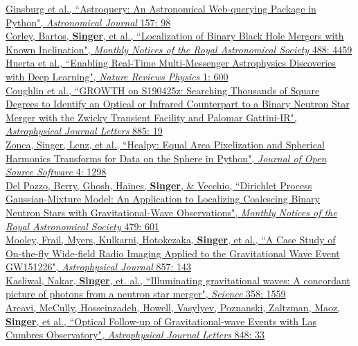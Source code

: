 \documentclass[10pt, letterpaper]{article} %
\newcommand{\years}[1]{\marginnote{\scriptsize #1}} %
\begin{document}
%
\years{2019}\href{https://doi.org/10.3847/1538-3881/aafc33}{Ginsburg et al., “Astroquery: An Astronomical Web-querying Package in Python", \emph{Astronomical Journal} 157: 98}\\[0.125cm]
%
\years{2019}\href{https://doi.org/10.1093/mnras/stz2072}{Corley, Bartos, \textbf{Singer}, et al., “Localization of Binary Black Hole Mergers with Known Inclination", \emph{Monthly Notices of the Royal Astronomical Society} 488: 4459}\\[0.125cm]
%
\years{2019}\href{https://doi.org/10.1038/s42254-019-0097-4}{Huerta et al., “Enabling Real-Time Multi-Messenger Astrophysics Discoveries with Deep Learning", \emph{Nature Reviews Physics} 1: 600}\\[0.125cm]
%
\years{2019}\href{https://doi.org/10.3847/2041-8213/ab4ad8}{Coughlin et al., “GROWTH on S190425z: Searching Thousands of Square Degrees to Identify an Optical or Infrared Counterpart to a Binary Neutron Star Merger with the Zwicky Transient Facility and Palomar Gattini-IR", \emph{Astrophysical Journal Letters} 885: 19}\\[0.125cm]
%
\years{2019}\href{https://doi.org/10.21105/joss.01298}{Zonca, Singer, Lenz, et al., “Healpy: Equal Area Pixelization and Spherical Harmonics Transforms for Data on the Sphere in Python", \emph{Journal of Open Source Software} 4: 1298}\\[0.125cm]
%
\years{2018}\href{https://doi.org/10.1093/mnras/sty1485}{Del Pozzo, Berry, Ghosh, Haines, \textbf{Singer}, \& Vecchio, “Dirichlet Process Gaussian-Mixture Model: An Application to Localizing Coalescing Binary Neutron Stars with Gravitational-Wave Observations", \emph{Monthly Notices of the Royal Astronomical Society} 479: 601}\\[0.125cm]
%
\years{2018}\href{https://doi.org/10.3847/1538-4357/aab7f3}{Mooley, Frail, Myers, Kulkarni, Hotokezaka, \textbf{Singer}, et al., “A Case Study of On-the-fly Wide-field Radio Imaging Applied to the Gravitational Wave Event GW151226", \emph{Astrophysical Journal} 857: 143}\\[0.125cm]
%
\years{2017}\href{https://doi.org/10.1126/science.aap9455}{Kasliwal, Nakar, \textbf{Singer}, et. al., “Illuminating gravitational waves: A concordant picture of photons from a neutron star merger", \emph{Science} 358: 1559}\\[0.125cm]
%
\years{2017}\href{https://doi.org/10.3847/2041-8213/aa910f}{Arcavi, McCully, Hosseinzadeh, Howell, Vasylyev, Poznanski, Zaltzman, Maoz, \textbf{Singer}, et al., “Optical Follow-up of Gravitational-wave Events with Las Cumbres Observatory", \emph{Astrophysical Journal Letters} 848: 33}\\[0.125cm]
\end{document}
